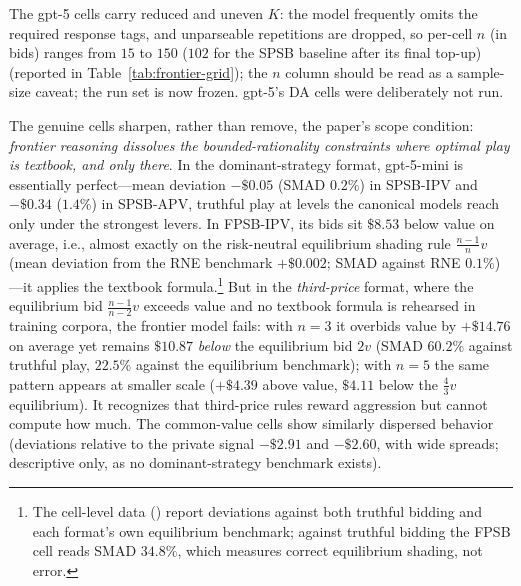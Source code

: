 The gpt-5 cells carry reduced and uneven $K$: the model frequently omits the required response tags, and unparseable repetitions are dropped, so per-cell $n$ (in bids) ranges from $15$ to $150$ ($102$ for the SPSB baseline after its final top-up) (reported in Table~\ref{tab:frontier-grid}); the $n$ column should be read as a sample-size caveat; the run set is now frozen. gpt-5's DA cells were deliberately not run.


The genuine cells sharpen, rather than remove, the paper's scope condition: \emph{frontier reasoning dissolves the bounded-rationality constraints where optimal play is textbook, and only there}. In the dominant-strategy format, gpt-5-mini is essentially perfect---mean deviation $-\$0.05$ (SMAD $0.2\%$) in SPSB-IPV and $-\$0.34$ ($1.4\%$) in SPSB-APV, truthful play at levels the canonical models reach only under the strongest levers. In FPSB-IPV, its bids sit $\$8.53$ below value on average, i.e., almost exactly on the risk-neutral equilibrium shading rule $\frac{n-1}{n}v$ (mean deviation from the RNE benchmark $+\$0.002$; SMAD against RNE $0.1\%$)---it applies the textbook formula.\footnote{The cell-level data () report deviations against both truthful bidding and each format's own equilibrium benchmark; against truthful bidding the FPSB cell reads SMAD $34.8\%$, which measures correct equilibrium shading, not error.} But in the \emph{third-price} format, where the equilibrium bid $\frac{n-1}{n-2}v$ exceeds value and no textbook formula is rehearsed in training corpora, the frontier model fails: with $n=3$ it overbids value by $+\$14.76$ on average yet remains $\$10.87$ \emph{below} the equilibrium bid $2v$ (SMAD $60.2\%$ against truthful play, $22.5\%$ against the equilibrium benchmark); with $n=5$ the same pattern appears at smaller scale ($+\$4.39$ above value, $\$4.11$ below the $\frac{4}{3}v$ equilibrium). It recognizes that third-price rules reward aggression but cannot compute how much. The common-value cells show similarly dispersed behavior (deviations relative to the private signal $-\$2.91$ and $-\$2.60$, with wide spreads; descriptive only, as no dominant-strategy benchmark exists).

